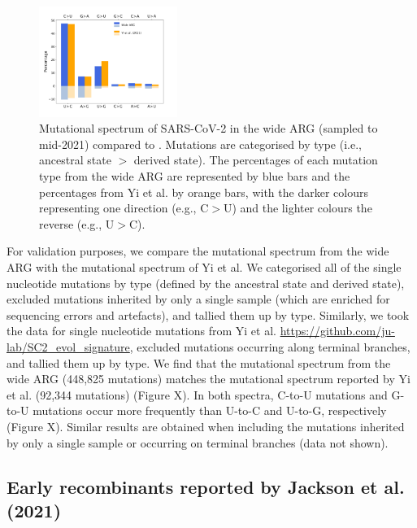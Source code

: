 \documentclass{article}
\begin{document}
\begin{figure}
\centering
\includegraphics[width=0.4\textwidth]{figures/mutational_spectra.pdf}
\caption{\label{fig:mutational_spectra}
Mutational spectrum of SARS-CoV-2 in
the wide ARG (sampled to mid-2021) compared to \cite{Yi2021-sc}.
Mutations are categorised by type (i.e., ancestral state $>$
derived state). The percentages of each mutation type from the wide ARG are
represented by blue bars and the percentages from Yi et al. by orange bars,
with the darker colours representing one direction (e.g., C$>$U) and the
lighter colours the reverse (e.g., U$>$C).}
\end{figure}


For validation purposes, we compare the mutational spectrum from the wide ARG
with the mutational spectrum of Yi et al. We categorised all of the single
nucleotide mutations by type (defined by the ancestral state and derived
state), excluded mutations inherited by only a single sample (which are
enriched for sequencing errors and artefacts), and tallied them up by type.
Similarly, we took the data for single nucleotide mutations from Yi et al.
\url{https://github.com/ju-lab/SC2_evol_signature}, excluded mutations
occurring along terminal branches, and tallied them up by type. We find that
the mutational spectrum from the wide ARG (448,825 mutations) matches the
mutational spectrum reported by Yi et al. (92,344 mutations) (Figure X). In
both spectra, C-to-U mutations and G-to-U mutations occur more frequently than
U-to-C and U-to-G, respectively (Figure X). Similar results are obtained when
including the mutations inherited by only a single sample or occurring on
terminal branches (data not shown).


\subsection{Early recombinants reported by Jackson et al. (2021)}
\end{document}
